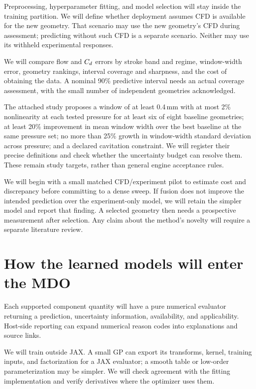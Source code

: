 Preprocessing, hyperparameter fitting, and model selection will stay inside the training partition. We will define whether deployment assumes CFD is available for the new geometry. That scenario may use the new geometry's CFD during assessment; predicting without such CFD is a separate scenario. Neither may use its withheld experimental responses.

We will compare flow and $C_d$ errors by stroke band and regime, window-width error, geometry rankings, interval coverage and sharpness, and the cost of obtaining the data. A nominal 90\% predictive interval needs an actual coverage assessment, with the small number of independent geometries acknowledged.

The attached study proposes a window of at least 0.4\,mm with at most 2\% nonlinearity at each tested pressure for at least six of eight baseline geometries; at least 20\% improvement in mean window width over the best baseline at the same pressure set; no more than 25\% growth in window-width standard deviation across pressure; and a declared cavitation constraint. We will register their precise definitions and check whether the uncertainty budget can resolve them. These remain study targets, rather than general engine acceptance rules.

We will begin with a small matched CFD/experiment pilot to estimate cost and discrepancy before committing to a dense sweep. If fusion does not improve the intended prediction over the experiment-only model, we will retain the simpler model and report that finding. A selected geometry then needs a prospective measurement after selection. Any claim about the method's novelty will require a separate literature review.

\section{How the learned models will enter the MDO}

Each supported component quantity will have a pure numerical evaluator returning a prediction, uncertainty information, availability, and applicability. Host-side reporting can expand numerical reason codes into explanations and source links.

We will train outside JAX. A small GP can export its transforms, kernel, training inputs, and factorization for a JAX evaluator; a smooth table or low-order parameterization may be simpler. We will check agreement with the fitting implementation and verify derivatives where the optimizer uses them.

